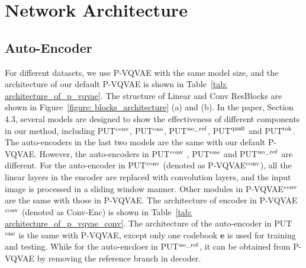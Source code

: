 \documentclass[10pt,twocolumn,letterpaper]{article}
\newcommand{\Tref}[1]{Table~\ref{#1}}
\newcommand{\Fref}[1]{Figure~\ref{#1}}
\begin{document}
\section{Network Architecture}
\label{sec: network_architecture}
\subsection{Auto-Encoder}
\label{sec: auto_encoder_architecture}
For different datasets, we use P-VQVAE with the same model size, and the architecture of our default P-VQVAE is shown in \Tref{tab: architecture_of_p_vqvae}. The structure of Linear and Conv ResBlocks are shown in \Fref{figure: blocks_architecture} (a) and (b). In the paper, Section 4.3, several models are designed to show the effectiveness of different components in our method, including PUT$^{\rm conv}$, PUT$^{\rm one}$, PUT$^{\rm no\_ref}$, PUT$^{\rm qua0}$ and PUT$^{\rm tok}$. The auto-encoders in the last two models are the same with our default P-VQVAE. However, the auto-encoders in PUT$^{\rm conv}$ , PUT$^{\rm one}$ and PUT$^{\rm no\_ref}$ are different. For the auto-encoder in PUT$^{\rm conv}$ (denoted as P-VQVAE$^{\rm conv}$), all the linear layers in the encoder are replaced with convolution layers, and the input image is processed in a sliding window manner. Other modules in P-VQVAE$^{\rm conv}$ are the same with those in P-VQVAE. The architecture of encoder in P-VQVAE$^{\rm conv}$ (denoted as Conv-Enc) is shown in \Tref{tab: architecture_of_p_vqvae_conv}. The architecture of the auto-encoder in PUT$^{\rm one}$ is the same with P-VQVAE, except only one codebook $\mathbf{e}$ is used for training and testing. While for the auto-encdoer in PUT$^{\rm no\_ref}$, it can be obtained from P-VQVAE by removing the reference branch in decoder.
\end{document}
